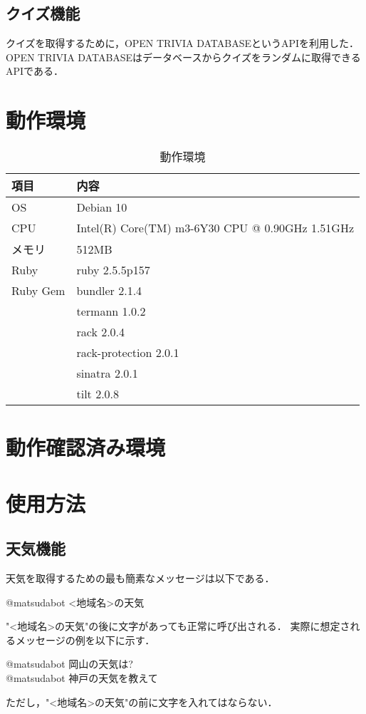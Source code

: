 \documentclass[12pt]{jsarticle}
\begin{document}
\subsection{クイズ機能}
クイズを取得するために，OPEN TRIVIA DATABASEというAPIを利用した．
OPEN TRIVIA DATABASEはデータベースからクイズをランダムに取得できるAPIである．

\section{動作環境}
\begin{table}[h]
\begin{center}
\caption{動作環境}\label{tab:2}
\begin{tabular}{l|l}
\hline\hline
\multicolumn{1}{l|}{項目} & \multicolumn{1}{l}{内容}\\
\hline
OS & Debian 10\\
CPU & Intel(R) Core(TM) m3-6Y30 CPU @ 0.90GHz 1.51GHz\\
メモリ & 512MB\\
Ruby & ruby 2.5.5p157\\
Ruby Gem & bundler 2.1.4\\
& termann 1.0.2\\
& rack 2.0.4\\
& rack-protection 2.0.1\\
& sinatra 2.0.1\\ 
& tilt 2.0.8\\
\hline
\end{tabular}
\end{center}
\end{table}

\section{動作確認済み環境}
\section{使用方法}

\subsection{天気機能}
天気を取得するための最も簡素なメッセージは以下である．
\begin{center}
@matsudabot <地域名>の天気\\
\end{center}
"<地域名>の天気"の後に文字があっても正常に呼び出される．
実際に想定されるメッセージの例を以下に示す．
\begin{center}
@matsudabot 岡山の天気は?\\
@matsudabot 神戸の天気を教えて\\
\end{center}
ただし，"<地域名>の天気"の前に文字を入れてはならない．
\end{document}
